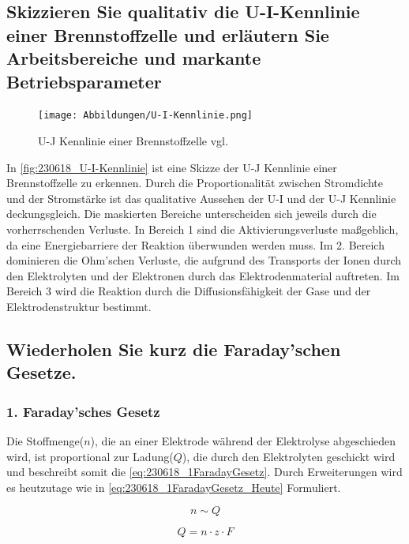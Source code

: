 \subsection{Skizzieren Sie qualitativ die U-I-Kennlinie einer Brennstoffzelle und erläutern Sie Arbeitsbereiche und markante Betriebsparameter}

\begin{figure}[H]
    \centering
    \texttt{[image: Abbildungen/U-I-Kennlinie.png]}
    \caption{U-J Kennlinie einer Brennstoffzelle vgl. \cite{BZ-Folien}}
    \label{fig:230618_U-I-Kennlinie}
\end{figure}

In \autoref{fig:230618_U-I-Kennlinie} ist eine Skizze der U-J Kennlinie einer Brennstoffzelle zu erkennen.
Durch die Proportionalität zwischen Stromdichte und der Stromstärke ist das qualitative Aussehen der U-I und der U-J Kennlinie deckungsgleich.
Die maskierten Bereiche unterscheiden sich jeweils durch die vorherrschenden Verluste.
In Bereich 1 sind die Aktivierungsverluste maßgeblich, da eine Energiebarriere der Reaktion überwunden werden muss.
Im 2. Bereich dominieren die Ohm'schen Verluste, die aufgrund des Transports der Ionen durch den Elektrolyten und der Elektronen durch das Elektrodenmaterial auftreten.
Im Bereich 3 wird die Reaktion durch die Diffusionsfähigkeit der Gase und der Elektrodenstruktur bestimmt.

\subsection{Wiederholen Sie kurz die Faraday'schen Gesetze.}

\subsubsection{1. Faraday'sches Gesetz}

Die Stoffmenge($n$), die an einer Elektrode während der Elektrolyse abgeschieden wird, ist proportional zur Ladung($Q$), die durch den Elektrolyten geschickt wird \cite{Faraday_G} und beschreibt somit die \autoref{eq:230618_1FaradayGesetz}.
Durch Erweiterungen wird es heutzutage wie in \autoref{eq:230618_1FaradayGesetz_Heute} Formuliert.

\begin{equation}
    n \sim Q
    \label{eq:230618_1FaradayGesetz}
\end{equation}

\begin{equation}
    Q = n \cdot z \cdot F
    \label{eq:230618_1FaradayGesetz_Heute}
\end{equation}

